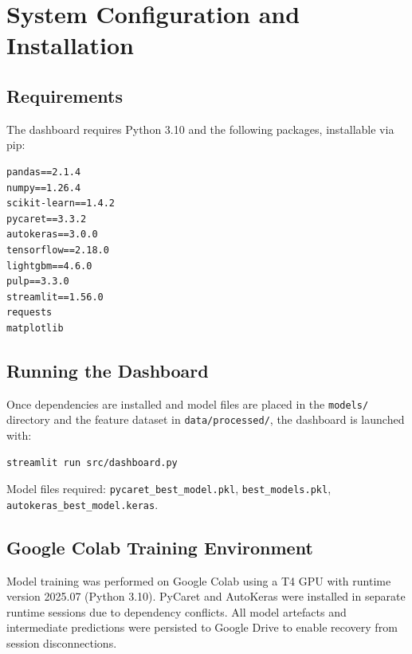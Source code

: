 \documentclass[11pt,english,listoffigures,listoftables]{tfgetsinf}
\begin{document}

\APPENDIX

\chapter{System Configuration and Installation}

\section{Requirements}

The dashboard requires Python 3.10 and the following packages, installable via pip:

\begin{verbatim}
pandas==2.1.4
numpy==1.26.4
scikit-learn==1.4.2
pycaret==3.3.2
autokeras==3.0.0
tensorflow==2.18.0
lightgbm==4.6.0
pulp==3.3.0
streamlit==1.56.0
requests
matplotlib
\end{verbatim}

\section{Running the Dashboard}

Once dependencies are installed and model files are placed in the \texttt{models/} directory and the feature dataset in \texttt{data/processed/}, the dashboard is launched with:

\begin{verbatim}
streamlit run src/dashboard.py
\end{verbatim}

Model files required: \texttt{pycaret\_best\_model.pkl}, \texttt{best\_models.pkl}, \texttt{autokeras\_best\_model.keras}.

\section{Google Colab Training Environment}

Model training was performed on Google Colab using a T4 GPU with runtime version 2025.07 (Python 3.10). PyCaret and AutoKeras were installed in separate runtime sessions due to dependency conflicts. All model artefacts and intermediate predictions were persisted to Google Drive to enable recovery from session disconnections.
\end{document}
